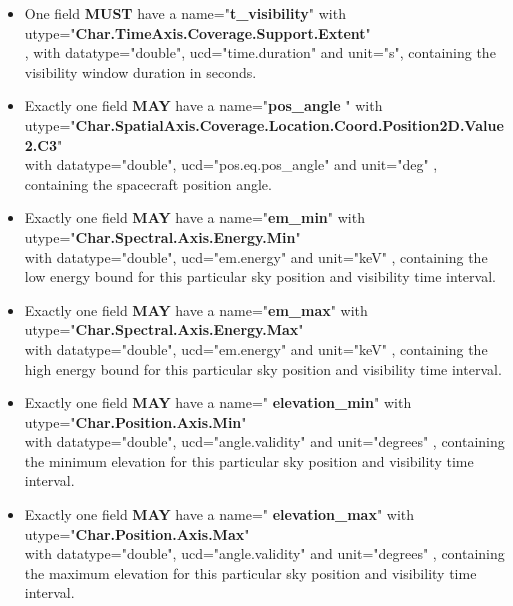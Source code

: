 \documentclass[11pt,a4paper]{ivoa}
\begin{document}
\begin{itemize}
\item One field \textbf{MUST} have a name="\textbf{t\_visibility}"
with\\ utype="\textbf{Char.TimeAxis.Coverage.Support.Extent}"\\, with
datatype="double", ucd="time.duration" and unit="s", containing the
visibility window duration in seconds.
\end{itemize}


\begin{itemize}
\item Exactly one field \textbf{MAY }have a name="\textbf{pos\_angle
}" with\\
utype="\textbf{Char.SpatialAxis.Coverage.Location.Coord.Position2D.Value2.C3}"\\
with datatype="double", ucd="pos.eq.pos\_angle" and unit="deg" , containing
the spacecraft position angle.
\end{itemize}


\begin{itemize}
\item Exactly one field \textbf{MAY }have a name="\textbf{em\_min}" with\\
utype="\textbf{Char.Spectral.Axis.Energy.Min}"\\
with datatype="double", ucd="em.energy" and unit="keV" , containing the
low energy bound for this particular sky position and visibility time interval.

\item Exactly one field \textbf{MAY }have a name="\textbf{em\_max}" with\\
utype="\textbf{Char.Spectral.Axis.Energy.Max}"\\
with datatype="double", ucd="em.energy" and unit="keV" , containing the
high energy bound for this particular sky position and visibility time interval.
\end{itemize}


\begin{itemize}
\item Exactly one field \textbf{MAY }have a name="\textbf{
elevation\_min}" with\\
utype="\textbf{Char.Position.Axis.Min}"\\ with
datatype="double", ucd="angle.validity" and unit="degrees" , containing
the minimum elevation for this particular sky position and visibility
time interval.
\end{itemize}

\begin{itemize}
\item Exactly one field \textbf{MAY }have a name="\textbf{
elevation\_max}" with\\
utype="\textbf{Char.Position.Axis.Max}"\\
with datatype="double", ucd="angle.validity" and unit="degrees" , containing
the maximum elevation for this particular sky position and visibility
time interval.
\end{itemize}
\end{document}
